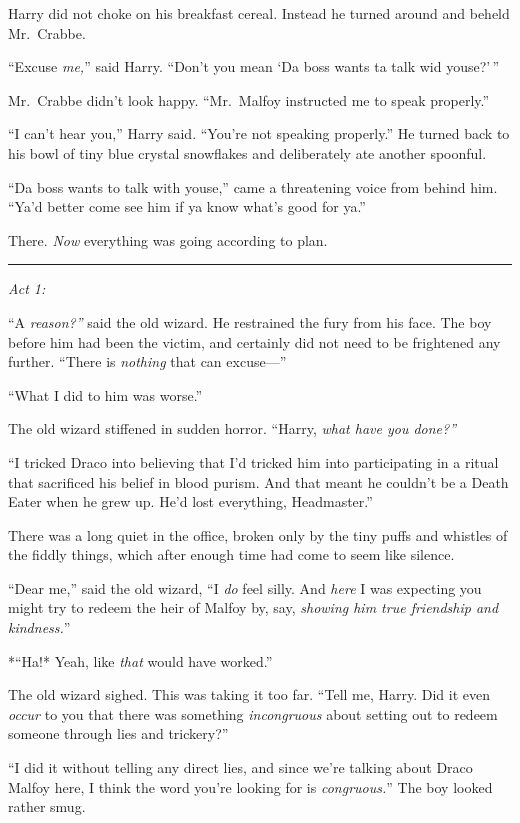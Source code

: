 Harry did not choke on his breakfast cereal. Instead he turned around
and beheld Mr.~Crabbe.

``Excuse \emph{me,}'' said Harry. ``Don't you mean `Da boss wants ta
talk wid youse?'\,''

Mr.~Crabbe didn't look happy. ``Mr.~Malfoy instructed me to speak
properly.''

``I can't hear you,'' Harry said. ``You're not speaking properly.'' He
turned back to his bowl of tiny blue crystal snowflakes and deliberately
ate another spoonful.

``Da boss wants to talk with youse,'' came a threatening voice from
behind him. ``Ya'd better come see him if ya know what's good for ya.''

There. \emph{Now} everything was going according to plan.

\begin{center}\rule{3in}{0.4pt}\end{center}

\emph{Act 1:}

``A \emph{reason?''} said the old wizard. He restrained the fury from
his face. The boy before him had been the victim, and certainly did not
need to be frightened any further. ``There is \emph{nothing} that can
excuse---''

``What I did to him was worse.''

The old wizard stiffened in sudden horror. ``Harry, \emph{what have you
done?''}

``I tricked Draco into believing that I'd tricked him into participating
in a ritual that sacrificed his belief in blood purism. And that meant
he couldn't be a Death Eater when he grew up. He'd lost everything,
Headmaster.''

There was a long quiet in the office, broken only by the tiny puffs and
whistles of the fiddly things, which after enough time had come to seem
like silence.

``Dear me,'' said the old wizard, ``I \emph{do} feel silly. And
\emph{here} I was expecting you might try to redeem the heir of Malfoy
by, say, \emph{showing him true friendship and kindness.}''

*``Ha!* Yeah, like \emph{that} would have worked.''

The old wizard sighed. This was taking it too far. ``Tell me, Harry. Did
it even \emph{occur} to you that there was something \emph{incongruous}
about setting out to redeem someone through lies and trickery?''

``I did it without telling any direct lies, and since we're talking
about Draco Malfoy here, I think the word you're looking for is
\emph{congruous.}'' The boy looked rather smug.

